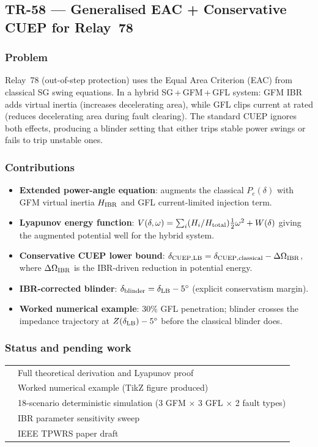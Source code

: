 \documentclass[12pt,a4paper]{article}
\newcommand{\cmark}{\ding{51}}
\newcommand{\pmark}{\ding{118}}   %
\begin{document}
\bigskip

\subsection{TR-58 — Generalised EAC + Conservative CUEP for Relay~78}
\label{sec:tr58}

\subsubsection{Problem}
Relay~78 (out-of-step protection) uses the Equal Area Criterion (EAC)
from classical SG swing equations.  In a hybrid SG\,+\,GFM\,+\,GFL system:
GFM IBR adds virtual inertia (increases decelerating area), while GFL
clips current at rated (reduces decelerating area during fault clearing).
The standard CUEP ignores both effects, producing a blinder setting that
either trips stable power swings or fails to trip unstable ones.

\subsubsection{Contributions}
\begin{itemize}
  \item \textbf{Extended power-angle equation}: augments the classical
    $P_e(\delta)$ with GFM virtual inertia $H_{\rm IBR}$ and GFL
    current-limited injection term.
  \item \textbf{Lyapunov energy function}: $V(\delta, \omega) =
    \sum_i (H_i/H_{\rm total})\tfrac{1}{2}\omega^2 + W(\delta)$
    giving the augmented potential well for the hybrid system.
  \item \textbf{Conservative CUEP lower bound}:
    $\delta_{\rm CUEP,LB} = \delta_{\rm CUEP,classical} - \Delta\Omega_{\rm IBR}$,
    where $\Delta\Omega_{\rm IBR}$ is the IBR-driven reduction in potential energy.
  \item \textbf{IBR-corrected blinder}:
    $\delta_{\rm blinder} = \delta_{\rm LB} - 5^\circ$ (explicit conservatism margin).
  \item \textbf{Worked numerical example}: 30\% GFL penetration; blinder
    crosses the impedance trajectory at $Z(\delta_{\rm LB}) - 5^\circ$
    before the classical blinder does.
\end{itemize}

\subsubsection{Status and pending work}
\begin{tabular}{ll}
  \cmark & Full theoretical derivation and Lyapunov proof \\
  \cmark & Worked numerical example (TikZ figure produced) \\
  \pmark & 18-scenario deterministic simulation (3 GFM $\times$ 3 GFL $\times$ 2 fault types) \\
  \pmark & IBR parameter sensitivity sweep \\
  \pmark & IEEE TPWRS paper draft \\
\end{tabular}
\end{document}

